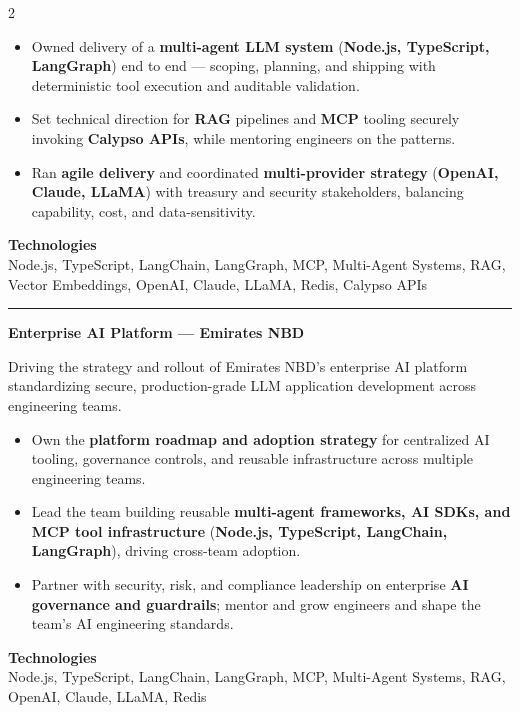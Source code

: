 \documentclass[10pt,a4paper]{article}
\newcommand{\blockdivider}{\vspace{0pt}\color{rulecolor}\rule{\linewidth}{0.5pt}\color{primary}\vspace{4pt}}
\newcommand{\projecttitle}[1]{\textbf{#1}\par\vspace{2pt}}
\begin{document}
\begin{paracol}{2}
\begin{itemize}

\item Owned delivery of a \textbf{multi-agent LLM system} (\textbf{Node.js, TypeScript, LangGraph}) end to end — scoping, planning, and shipping with deterministic tool execution and auditable validation.

\item Set technical direction for \textbf{RAG} pipelines and \textbf{MCP} tooling securely invoking \textbf{Calypso APIs}, while mentoring engineers on the patterns.

\item Ran \textbf{agile delivery} and coordinated \textbf{multi-provider strategy} (\textbf{OpenAI, Claude, LLaMA}) with treasury and security stakeholders, balancing capability, cost, and data-sensitivity.

\end{itemize}

\textbf{Technologies}\\
Node.js, TypeScript, LangChain, LangGraph, MCP, Multi-Agent Systems, RAG, Vector Embeddings, OpenAI, Claude, LLaMA, Redis, Calypso APIs

\blockdivider

\projecttitle{Enterprise AI Platform — Emirates NBD}

Driving the strategy and rollout of Emirates NBD's enterprise AI platform standardizing secure, production-grade LLM application development across engineering teams.

\begin{itemize}

\item Own the \textbf{platform roadmap and adoption strategy} for centralized AI tooling, governance controls, and reusable infrastructure across multiple engineering teams.

\item Lead the team building reusable \textbf{multi-agent frameworks, AI SDKs, and MCP tool infrastructure} (\textbf{Node.js, TypeScript, LangChain, LangGraph}), driving cross-team adoption.

\item Partner with security, risk, and compliance leadership on enterprise \textbf{AI governance and guardrails}; mentor and grow engineers and shape the team's AI engineering standards.

\end{itemize}

\textbf{Technologies}\\
Node.js, TypeScript, LangChain, LangGraph, MCP, Multi-Agent Systems, RAG, OpenAI, Claude, LLaMA, Redis


\end{paracol}
\end{document}
